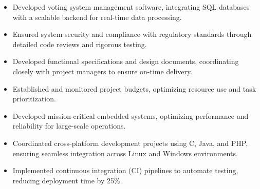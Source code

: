 \par\smallskip
\noindent
\begin{minipage}{20cm}
  \begin{minipage}{9.75cm}
    \begin{itemize}
      \item Developed voting system management software, integrating SQL databases with a scalable backend for real-time data processing.
      \item Ensured system security and compliance with regulatory standards through detailed code reviews and rigorous testing.
    \end{itemize}
  \end{minipage}
  \hfill
  \begin{minipage}{9.75cm}
    \begin{itemize}
      \item Developed functional specifications and design documents, coordinating closely with project managers to ensure on-time delivery.
      \item Established and monitored project budgets, optimizing resource use and task prioritization.
    \end{itemize}
  \end{minipage}
\end{minipage}
\par\smallskip
\divider

\par\smallskip
\noindent
\begin{minipage}{20cm}
  \begin{minipage}{9.75cm}
    \begin{itemize}
      \item Developed mission-critical embedded systems, optimizing performance and reliability for large-scale operations.
      \item Coordinated cross-platform development projects using C, Java, and PHP, ensuring seamless integration across Linux and Windows environments.
    \end{itemize}
  \end{minipage}
  \hfill
  \begin{minipage}{9.75cm}
    \begin{itemize}
      \item Implemented continuous integration (CI) pipelines to automate testing, reducing deployment time by 25\%.
    \end{itemize}
  \end{minipage}
\end{minipage}

